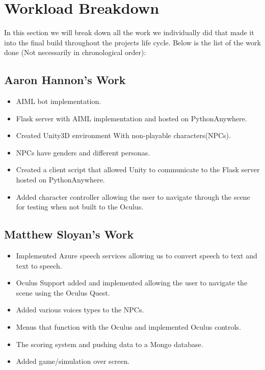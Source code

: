 \section{Workload Breakdown}
In this section we will break down all the work we individually did that made it into the final build throughout the projects life cycle. Below is the list of the work done (Not necessarily in chronological order):

\subsection{Aaron Hannon's Work}
\begin{itemize}
    \item AIML bot implementation.
    \item Flask server with AIML implementation and hosted on PythonAnywhere.
    \item Created Unity3D environment With non-playable characters(NPCs).
    \item NPCs have genders and different personas.
    \item Created a client script that allowed Unity to communicate to the Flask server hosted on PythonAnywhere.
    \item Added character controller allowing the user to navigate through the scene for testing when not built to the Oculus.
\end{itemize}

\subsection{Matthew Sloyan's Work}
\begin{itemize}
    \item Implemented Azure speech services allowing us to convert speech to text and text to speech.
    \item Oculus Support added and implemented allowing the user to navigate the scene using the Oculus Quest.
    \item Added various voices types to the NPCs.
    \item Menus that function with the Oculus and implemented Oculus controls.
    \item The scoring system and pushing data to a Mongo database.
    \item Added game/simulation over screen.
\end{itemize}
